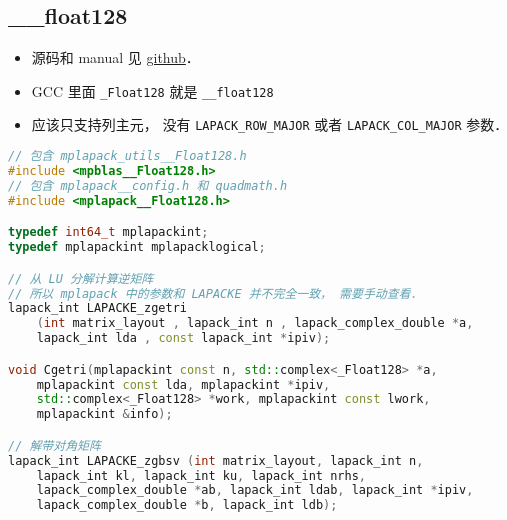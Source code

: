 
\begin{issues}
\issueDraft
\end{issues}


\subsection{__float128}
\begin{itemize}
\item 源码和 manual 见 \href{https://github.com/nakatamaho/mplapack}{github}．
\item GCC 里面 \verb|_Float128| 就是 \verb|__float128|
\item 应该只支持列主元， 没有 \verb|LAPACK_ROW_MAJOR| 或者 \verb|LAPACK_COL_MAJOR| 参数．
\end{itemize}

\begin{lstlisting}[language=cpp]
// 包含 mplapack_utils__Float128.h
#include <mpblas__Float128.h>
// 包含 mplapack__config.h 和 quadmath.h
#include <mplapack__Float128.h>

typedef int64_t mplapackint;
typedef mplapackint mplapacklogical;

// 从 LU 分解计算逆矩阵
// 所以 mplapack 中的参数和 LAPACKE 并不完全一致， 需要手动查看．
lapack_int LAPACKE_zgetri
    (int matrix_layout , lapack_int n , lapack_complex_double *a,
    lapack_int lda , const lapack_int *ipiv);

void Cgetri(mplapackint const n, std::complex<_Float128> *a,
    mplapackint const lda, mplapackint *ipiv,
    std::complex<_Float128> *work, mplapackint const lwork,
    mplapackint &info);

// 解带对角矩阵
lapack_int LAPACKE_zgbsv (int matrix_layout, lapack_int n,
    lapack_int kl, lapack_int ku, lapack_int nrhs,
    lapack_complex_double *ab, lapack_int ldab, lapack_int *ipiv,
    lapack_complex_double *b, lapack_int ldb);
\end{lstlisting}
